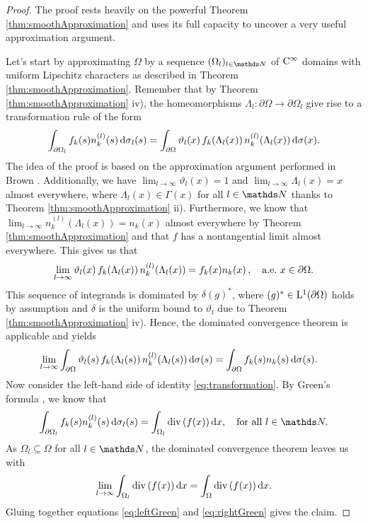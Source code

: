 \begin{proof}
  The proof rests heavily on the powerful Theorem \ref{thm:smoothApproximation} and uses its full capacity to uncover a very useful approximation argument.

  Let's start by approximating $\Omega$ by a sequence $(\Omega_l)_{l \in \N}$ of $\mathrm{C}^\infty$ domains with uniform Lipschitz characters as described in Theorem \ref{thm:smoothApproximation}. 
  Remember that by Theorem \ref{thm:smoothApproximation} iv), the homeomorphisms $\Lambda_l \colon \partial\Omega \to \partial\Omega_l$ give rise to a transformation rule of the form 
  \begin{align}
    \label{eq:transformation}
    \int_{\partial\Omega_l} f_k(s) n_k^{(l)}(s) \, {\operatorname{d}\!{\sigma}}_l(s)
    = \int_{\partial\Omega} \vartheta_l(x) \, f_k(\Lambda_l(x)) \, n_k^{(l)}(\Lambda_l(x)) \, {\operatorname{d}\!{\sigma}}(x).
  \end{align}
  The idea of the proof is based on the approximation argument performed in Brown \cite[Prop.\@~2.4]{brown}. 
  Additionally, we have $\lim_{l \to \infty} \vartheta_l(x) = 1$ and $\lim_{l \to \infty} \Lambda_l(x) = x$ almost everywhere, where $\Lambda_l(x) \in \Gamma(x)$ for all $l \in \N$ thanks to Theorem \ref{thm:smoothApproximation} ii).
  Furthermore, we know that $\lim_{l \to \infty} n_k^{(l)}(\Lambda_l(x)) = n_k(x)$ almost everywhere by Theorem \ref{thm:smoothApproximation} and that $f$ has a nontangential limit almost everywhere.
  This gives us that 
  \begin{align*}
    \lim_{l \to \infty} \vartheta_l(x) \, f_k(\Lambda_l(x)) \, n_k^{(l)}(\Lambda_l(x)) = f_k(x) n_k(x)\,, \quad\text{a.e.\@ } x \in \partial\Omega.
  \end{align*}
  This sequence of integrands is dominated by $\delta (g)^*$, where $(g)^* \in \mathrm{L}^1(\partial\Omega)$ holds by assumption and $\delta$ is the uniform bound to $\vartheta_l$ due to Theorem \ref{thm:smoothApproximation} iv).
  Hence, the dominated convergence theorem is applicable and yields
  \begin{align}
    \label{eq:leftGreen}
    \lim_{l \to \infty} \int_{\partial \Omega} \vartheta_l(s) \, f_k(\Lambda_l(s))\,  n_k^{(l)}(\Lambda_l(s))\, {\operatorname{d}\!{\sigma}}(s)
    &= 
    \int_{\partial\Omega} f_k(s) n_k(s) \, {\operatorname{d}\!{\sigma}}(s).
  \end{align}
  Now consider the left-hand side of identity \eqref{eq:transformation}.
  By Green's formula \cite[p.\@~711f.]{evans}, we know that
  \begin{align*}
    \int_{\partial\Omega_l} f_k(s) n_k^{(l)}(s) \d\sigma_l(s)
    = \int_{\Omega_l} \div(f(x)) \d x, \quad\text{for all } l \in \N.
  \end{align*}
  As $\Omega_l \subseteq \Omega$ for all $l \in \N$, the dominated convergence theorem leaves us with
  \begin{align}
    \label{eq:rightGreen}
    \lim_{l \to \infty} \int_{\Omega_l} \mathrm{div\,} (f(x)) \, {\operatorname{d}\!{x}} = \int_\Omega \mathrm{div\,} (f(x)) \, {\operatorname{d}\!{x}}.
  \end{align}
  Gluing together equations \eqref{eq:leftGreen} and \eqref{eq:rightGreen} gives the claim.
\end{proof}

